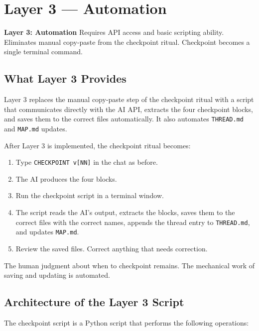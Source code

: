 \documentclass[12pt,letterpaper]{article}
\begin{document}
\section{Layer 3 --- Automation}

\begin{layerbox3}
\textbf{Layer 3: Automation} \quad Requires API access and basic scripting ability.\\
Eliminates manual copy-paste from the checkpoint ritual.
Checkpoint becomes a single terminal command.
\end{layerbox3}

\subsection{What Layer 3 Provides}

Layer 3 replaces the manual copy-paste step of the checkpoint ritual with
a script that communicates directly with the AI API, extracts the four
checkpoint blocks, and saves them to the correct files automatically.
It also automates \texttt{THREAD.md} and \texttt{MAP.md} updates.

After Layer 3 is implemented, the checkpoint ritual becomes:

\begin{enumerate}
  \item Type \texttt{CHECKPOINT v[NN]} in the chat as before.
  \item The AI produces the four blocks.
  \item Run the checkpoint script in a terminal window.
  \item The script reads the AI's output, extracts the blocks,
        saves them to the correct files with the correct names,
        appends the thread entry to \texttt{THREAD.md},
        and updates \texttt{MAP.md}.
  \item Review the saved files. Correct anything that needs correction.
\end{enumerate}

The human judgment about when to checkpoint remains. The mechanical
work of saving and updating is automated.

\subsection{Architecture of the Layer 3 Script}

The checkpoint script is a Python script that performs the following
operations:
\end{document}
